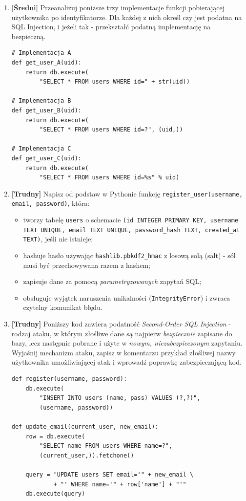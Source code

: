 \documentclass[12pt,a4paper]{article}
\begin{document}
\begin{enumerate}
\item \textbf{[Średni]} Przeanalizuj poniższe trzy implementacje funkcji pobierającej użytkownika po identyfikatorze. Dla każdej
z nich określ czy jest podatna na SQL Injection, i jeżeli tak - przekształć podatną implementację na bezpieczną.
\begin{tcolorbox}
\begin{verbatim}
# Implementacja A
def get_user_A(uid):
    return db.execute(
        "SELECT * FROM users WHERE id=" + str(uid))
 
# Implementacja B
def get_user_B(uid):
    return db.execute(
        "SELECT * FROM users WHERE id=?", (uid,))
 
# Implementacja C
def get_user_C(uid):
    return db.execute(
        "SELECT * FROM users WHERE id=%s" % uid)
\end{verbatim}
\end{tcolorbox}


\item \textbf{[Trudny]} Napisz od podstaw w Pythonie funkcję
\texttt{register\_user(username, email, password)}, która:
\begin{itemize}
    \item tworzy tabelę \texttt{users} o schemacie
            \texttt{(id INTEGER PRIMARY KEY, username TEXT UNIQUE,
            email TEXT UNIQUE, password\_hash TEXT, created\_at TEXT)},
            jeśli nie istnieje;
    \item hashuje hasło używając \texttt{hashlib.pbkdf2\_hmac}
            z losową solą (salt) - sól musi być przechowywana
            razem z hashem;
    \item zapisuje dane za pomocą \emph{parametryzowanych}
            zapytań SQL;
    \item obsługuje wyjątek naruszenia unikalności
            (\texttt{IntegrityError}) i zwraca czytelny komunikat
            błędu.
\end{itemize}

\item \textbf{[Trudny]} Poniższy kod zawiera podatność \emph{Second-Order SQL Injection} - rodzaj ataku, w którym złośliwe dane są najpierw \emph{bezpiecznie} zapisane do bazy,
lecz następnie pobrane i użyte w \emph{nowym, niezabezpieczonym} zapytaniu. Wyjaśnij mechanizm ataku, zapisz w komentarzu przykład złośliwej nazwy użytkownika umożliwiającej atak
i wprowadź poprawkę zabezpieczającą kod.
\begin{tcolorbox}
\begin{verbatim}
def register(username, password):
    db.execute(
        "INSERT INTO users (name, pass) VALUES (?,?)",
        (username, password))
 
def update_email(current_user, new_email):
    row = db.execute(
        "SELECT name FROM users WHERE name=?",
        (current_user,)).fetchone()
 
    query = "UPDATE users SET email='" + new_email \
            + "' WHERE name='" + row['name'] + "'"
    db.execute(query)
\end{verbatim}
\end{tcolorbox}

\end{enumerate}
\end{document}
